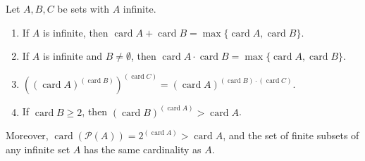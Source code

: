 Let $A, B, C$ be sets with $A$ infinite.
\begin{enumerate}
\item If $A$ is infinite, then $\operatorname{card} A + \operatorname{card} B = \max\{\operatorname{card} A, \operatorname{card} B\}$.
\item If $A$ is infinite and $B \neq \emptyset$, then $\operatorname{card} A \cdot \operatorname{card} B = \max\{\operatorname{card} A, \operatorname{card} B\}$.
\item $((\operatorname{card} A)^{(\operatorname{card} B)})^{(\operatorname{card} C)} = (\operatorname{card} A)^{(\operatorname{card} B) \cdot (\operatorname{card} C)}$.
\item If $\operatorname{card} B \geq 2$, then $(\operatorname{card} B)^{(\operatorname{card} A)} > \operatorname{card} A$.
\end{enumerate}
Moreover, $\operatorname{card}(\mathcal{P}(A)) = 2^{(\operatorname{card} A)} > \operatorname{card} A$, and the set of finite subsets of any infinite set $A$ has the same cardinality as $A$.
